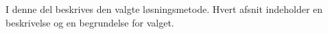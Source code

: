 I denne del beskrives den valgte løsningsmetode.
Hvert afsnit indeholder en beskrivelse og en begrundelse for valget.